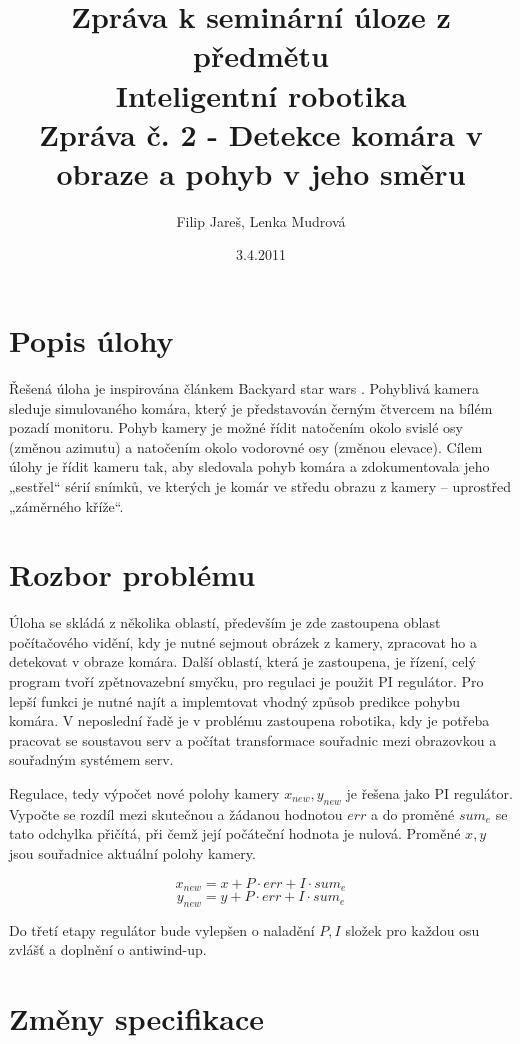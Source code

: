 \documentclass[a4paper,10pt]{article}
\title{Zpráva k seminární úloze z předmětu\\ Inteligentní robotika \\ {\small Zpráva č. 2 - Detekce komára v obraze a pohyb v jeho směru}}
\author{Filip Jareš, Lenka Mudrová}
\date{3.4.2011}
\begin{document}
\maketitle
\newpage


\section{Popis úlohy}

Řešená úloha je inspirována článkem Backyard star wars \cite{zadani}. Pohyblivá kamera sleduje simulovaného komára, který je představován černým čtvercem na bílém pozadí monitoru. Pohyb kamery je možné řídit natočením okolo svislé osy (změnou azimutu) a natočením okolo vodorovné osy (změnou elevace). Cílem úlohy je řídit kameru tak, aby sledovala pohyb komára a zdokumentovala jeho „sestřel“ sérií snímků, ve kterých je komár ve středu obrazu z kamery – uprostřed „záměrného kříže“.

\section{Rozbor problému}

Úloha se skládá z několika oblastí, především je zde zastoupena oblast počítačového vidění, kdy je nutné sejmout obrázek z kamery, zpracovat ho a detekovat v obraze komára. Další oblastí, která je zastoupena, je řízení, celý program tvoří zpětnovazební smyčku, pro regulaci je použit PI regulátor. Pro lepší funkci je nutné najít a implemtovat vhodný způsob predikce pohybu komára. V neposlední řadě je v problému zastoupena robotika, kdy je potřeba pracovat se soustavou serv a počítat transformace souřadnic mezi obrazovkou a souřadným systémem serv.

Regulace, tedy výpočet nové polohy kamery $x_{new}, y_{new}$ je řešena jako PI regulátor. Vypočte se rozdíl mezi skutečnou a žádanou hodnotou $err$ a do proměné $sum_e$ se tato odchylka přičítá, při čemž její počáteční hodnota je nulová. Proměné $x, y$ jsou souřadnice aktuální polohy kamery.

$$x_{new} = x + P\cdot err + I\cdot sum_e$$
$$y_{new} = y + P\cdot err + I\cdot sum_e$$

Do třetí etapy regulátor bude vylepšen o naladění $P, I$ složek pro každou osu zvlášť a doplnění o antiwind-up. 

\section{Změny specifikace}
\end{document}

